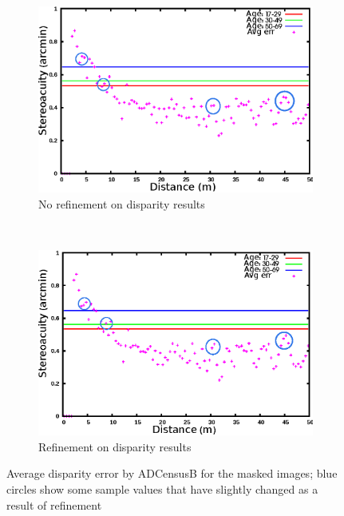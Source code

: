 \begin{figure}[H]
\centering
\begin{subfigure}{\linewidth}
\centering
\includegraphics[scale=0.95]{adcenmsk3NoLRmrk}
\caption{No refinement on disparity results}
\label{fig:adcmnoLR}
\vspace{2mm}
\end{subfigure}\\
\begin{subfigure}{\linewidth}
\centering
\includegraphics[scale=0.95]{adcenmsk3mrk}
\caption{Refinement on disparity results}
\label{fig:adcm3mrk}
\end{subfigure}
\caption{Average disparity error by ADCensusB for the masked images; blue circles show some sample values that have slightly changed as a result of refinement}
\label{fig:adcMLRnoLR}
\end{figure} 

